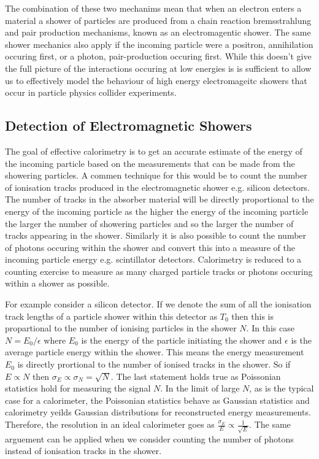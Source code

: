 The combination of these two mechanims mean that when an electron enters a material a shower of particles are produced from a chain reaction bremsstrahlung and pair production mechanisms, known as an electromagentic shower.  The same shower mechanics also apply if the incoming particle were a positron, annihilation occuring first, or a photon, pair-production occuring first.  While this doesn't give the full picture of the interactions occuring at low energies is is sufficient to allow us to effectively model the behaviour of high energy electromageitc showers that occur in particle physics collider experiments.

\subsection{Detection of Electromagnetic Showers}
The goal of effective calorimetry is to get an accurate estimate of the energy of the incoming particle based on the measurements that can be made from the showering particles.  A commen technique for this would be to count the number of ionisation tracks produced in the electromagnetic shower e.g. silicon detectors.  The number of tracks in the absorber material will be directly proportional to the energy of the incoming particle as the higher the energy of the incoming particle the larger the number of showering particles and so the larger the number of tracks appearing in the shower.  Similarly it is also possible to count the number of photons occuring within the shower and convert this into a measure of the incoming particle energy e.g. scintillator detectors.  Calorimetry is reduced to a counting exercise to measure as many charged particle tracks or photons occuring within a shower as possible.

For example consider a silicon detector.  If we denote the sum of all the ionisation track lengths of a particle shower within this detector as $T_{0}$ then this is propartional to the number of ionising particles in the shower $N$.  In this case $N = E_{0}/\epsilon$ where $E_{0}$ is the energy of the particle initiating the shower and $\epsilon$ is the average particle energy within the shower.  This means the energy measurement $E_{0}$ is directly prortional to the number of ionised tracks in the shower.  So if $E \propto N$ then $\sigma_{E} \propto \sigma_{N} = \sqrt{N}$.  The last statement holds true as Poissonian statistics hold for measuring the signal $N$.  In the limit of large $N$, as is the typical case for a calorimeter, the Poissonian statistics behave as Gaussian statistics and calorimetry yeilds Gaussian distributions for reconstructed energy measurements.  Therefore, the resolution in an ideal calorimeter goes as $\frac{\sigma_{E}}{E} \propto \frac{1}{\sqrt{E}}$.  The same arguement can be applied when we consider counting the number of photons instead of ionisation tracks in the shower.


